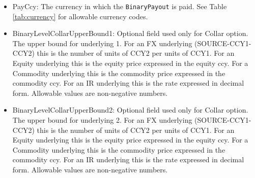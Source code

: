\begin{itemize}
\item PayCcy: The currency in which the \verb+BinaryPayout+ is paid.  See Table \ref{tab:currency} for allowable currency codes.
\item BinaryLevelCollarUpperBound1: Optional field used only for Collar option. The upper bound for underlying 1. For an FX underlying (SOURCE-CCY1-CCY2) this is the number of units of
  CCY2 per units of CCY1. For an Equity underlying this is the equity price expressed in the equity ccy.  For a Commodity underlying this is the commodity price expressed in the commodity ccy. For an IR underlying this is the rate expressed in decimal form. Allowable values
  are non-negative numbers.
\item BinaryLevelCollarUpperBound2: Optional field used only for Collar option. The upper bound for underlying 2. For an FX underlying (SOURCE-CCY1-CCY2) this is the number of units of
  CCY2 per units of CCY1. For an Equity underlying this is the equity price expressed in the equity ccy.  For a Commodity underlying this is the commodity price expressed in the commodity ccy. For an IR underlying this is the rate expressed in decimal form. Allowable values
  are non-negative numbers.

\end{itemize}
